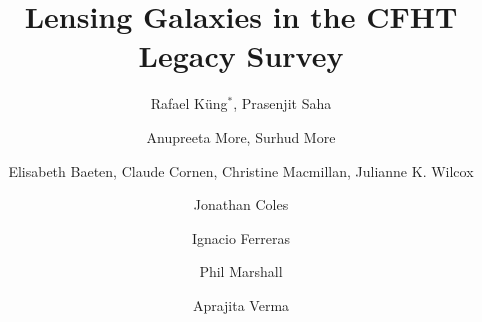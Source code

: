 \documentclass{ws-procs975x65}
\begin{document}
\title{Lensing Galaxies in the CFHT Legacy Survey}

\author{
  Rafael K\"ung$^*$, Prasenjit Saha
}
\address{
Physik-Institut, University of Zurich,\\
Winterthurerstrasse 190, 8057 Zurich, Switzerland\\
$^*$E-mail: rafael\_kueng@uzh.ch
}
\author{
  Anupreeta More, Surhud More
}
\address{
  Kavli Institute for the Physics and Mathematics of the Universe, University of Tokyo\\ 5-1-5 Kashiwanoha, Kashiwa-shi 277-8583, Japan
}

\author{
  Elisabeth Baeten, Claude Cornen, Christine Macmillan, Julianne K. Wilcox
}
\address{
  Zooniverse, c/o Astrophysics Department, University of Oxford\\
  Oxford OX1 3RH, UK
}

\author{
  Jonathan Coles
}
\address{
  Exascale Research Computing Lab, Campus Teratec,\\
  2 Rue de la Piquetterie, 91680 Bruyeres-le-Chatel, France
}

\author{Ignacio Ferreras}
\address{Mullard Space Science Laboratory, University College London, Holmbury St Mary, Dorking, Surrey RH5 6NT, UK}

\author{
  Phil Marshall
}
\address{
  Kavli Institute for Particle Astrophysics and Cosmology, Stanford University\\
  452 Lomita Mall, Stanford, CA 94035, USA
}

\author{
  Aprajita Verma
}
\address{
  Sub-department of Astrophysics, University of Oxford, Denys Wilkinson Building\\
  Keble Road, Oxford, OX1 3RH, UK
}





% 
% 
% 
\end{document}
